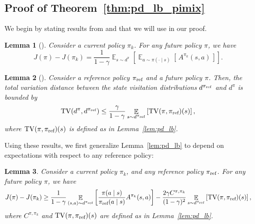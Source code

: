 \documentclass{article}
\newtheorem{lemma}{Lemma}
\begin{document}
\subsection{Proof of Theorem~\ref{thm:pd_lb_pimix}}

We begin by stating results from \citet{kakade_2002} and \citet{achiam_2017} that we will use in our proof.

\begin{lemma}[\citet{kakade_2002}]\label{lem:pd_equal}
Consider a current policy $\pi_k$. For any future policy $\pi$, we have
\begin{equation}
J(\pi) - J(\pi_k) = \frac{1}{1-\gamma} \mathop{\mathbb{E}}_{s \sim d^{\pi}} \left[ \mathop{\mathbb{E}}_{a \sim \pi(\cdot \mid s)} \left[ \,  A^{\pi_k}(s,a) \, \right] \right].
\end{equation}
\end{lemma}

\begin{lemma}[\citet{achiam_2017}]\label{lem:tv_stat}
Consider a reference policy $\pi_{\textnormal{ref}}$ and a future policy $\pi$. Then, the total variation distance between the state visitation distributions $d^{\pi_{\textnormal{ref}}}$ and $d^\pi$ is bounded by
\begin{equation}
\operatorname{TV}(d^\pi,d^{\pi_{\textnormal{ref}}}) \leq \frac{\gamma}{1-\gamma} \mathop{\mathbb{E}}_{s \sim d^{\pi_{\textnormal{ref}}}} \left[ \operatorname{TV}(\pi,\pi_{\textnormal{ref}})(s) \right],
\end{equation}
where $\operatorname{TV}(\pi,\pi_{\textnormal{ref}})(s)$ is defined as in Lemma~\ref{lem:pd_lb}.
\end{lemma}

Using these results, we first generalize Lemma~\ref{lem:pd_lb} to depend on expectations with respect to any reference policy:

\begin{lemma}\label{lem:pd_lb_piref}
Consider a current policy $\pi_k$, and any reference policy $\pi_{\textnormal{ref}}$. For any future policy $\pi$, we have
\begin{equation}\label{eq:pd_lb_piref}
J(\pi) - J(\pi_k) \geq \frac{1}{1-\gamma} \mathop{\mathbb{E}}_{(s,a) \sim d^{\pi_{\textnormal{ref}}}} \left[ \frac{\pi(a \mid s)}{\pi_{\textnormal{ref}}(a \mid s)} A^{\pi_k}(s,a) \right] - \frac{2\gamma C^{\pi,\pi_k}}{(1-\gamma)^2} \mathop{\mathbb{E}}_{s \sim d^{\pi_{\textnormal{ref}}}} \left[ \operatorname{TV}(\pi,\pi_{\textnormal{ref}})(s) \right],
\end{equation}
where $C^{\pi,\pi_k}$ and $\operatorname{TV}(\pi,\pi_{\textnormal{ref}})(s)$ are defined as in Lemma~\ref{lem:pd_lb}. 
\end{lemma}
\end{document}
